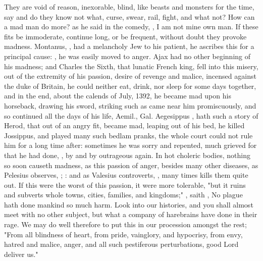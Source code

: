 They are void of reason, inexorable, blind, like beasts and monsters for the
time, say and do they know not what, curse, swear, rail, fight, and what not?
How can a mad man do more? as he said in the comedy,
, I am not mine own man. If
these fits be immoderate, continue long, or be frequent, without doubt they
provoke madness. Montanus, , had a melancholy
Jew to his patient, he ascribes this for a principal cause: , he was easily moved to anger. Ajax had no other beginning
of his madness; and Charles the Sixth, that lunatic French king, fell into this
misery, out of the extremity of his passion, desire of revenge and malice,
incensed against the duke of Britain, he could neither
eat, drink, nor sleep for some days together, and in the end, about the calends
of July, 1392, he became mad upon his horseback, drawing his sword, striking
such as came near him promiscuously, and so continued all the days of his life,
Aemil.,  Gal. 
Aegesippus , hath such
a story of Herod, that out of an angry fit, became mad,
leaping out of his bed, he killed Jossippus, and played
many such bedlam pranks, the whole court could not rule him for a long time
after: sometimes he was sorry and repented, much grieved for that he had done,
, by and by outrageous again. In hot choleric
bodies, nothing so soon causeth madness, as this passion of anger, besides many
other diseases, as Pelesius observes, ; : and as
Valesius controverts, , many times kills them quite out. If this were the worst of
this passion, it were more tolerable, "but it ruins and
subverts whole towns, cities, families, and kingdoms;"
, saith \Seneca{},
 No plague hath done mankind so much
harm. Look into our histories, and you shall almost meet with no other subject,
but what a company of harebrains have done in their rage.
We may do well therefore to put this in our procession amongst the rest; "From
all blindness of heart, from pride, vainglory, and hypocrisy, from envy, hatred
and malice, anger, and all such pestiferous perturbations, good Lord deliver
us."


